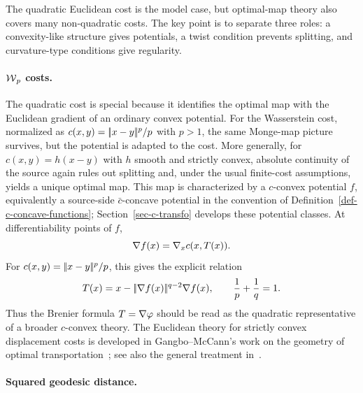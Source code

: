 The quadratic Euclidean cost is the model case, but optimal-map theory also covers many non-quadratic costs. The key point is to separate three roles: a convexity-like structure gives potentials, a twist condition prevents splitting, and curvature-type conditions give regularity.

\paragraph{\texorpdfstring{$\operatorname{\mathcal{W}}_p$ costs.}{Wp costs}}

The quadratic cost is special because it identifies the optimal map with the Euclidean gradient of an ordinary convex potential. For the Wasserstein cost, normalized as \(c(x,y)=|\!| x-y |\!|^p/p\) with \(p>1\), the same Monge-map picture survives, but the potential is adapted to the cost. More generally, for \(c(x,y)=h(x-y)\) with \(h\) smooth and strictly convex, absolute continuity of the source again rules out splitting and, under the usual finite-cost assumptions, yields a unique optimal map. This map is characterized by a \(c\)-convex potential \(f\), equivalently a source-side \(\bar c\)-concave potential in the convention of Definition~\ref{def-c-concave-functions}; Section~\ref{sec-c-transfo} develops these potential classes. At differentiability points of \(f\),
\[
	\nabla f(x)=\nabla_x c(x,T(x)).
\]
For \(c(x,y)=|\!| x-y |\!|^p/p\), this gives the explicit relation
\[
	T(x)=x-|\!| \nabla f(x) |\!|^{q-2}\nabla f(x),
	\qquad \frac1p+\frac1q=1.
\]
Thus the Brenier formula \(T=\nabla\varphi\) should be read as the quadratic representative of a broader \(c\)-convex theory. The Euclidean theory for strictly convex displacement costs is developed in Gangbo--McCann's work on the geometry of optimal transportation~\cite{gangbo1996geometry}; see also the general treatment in~\cite{Villani09}.

\paragraph{Squared geodesic distance.}

